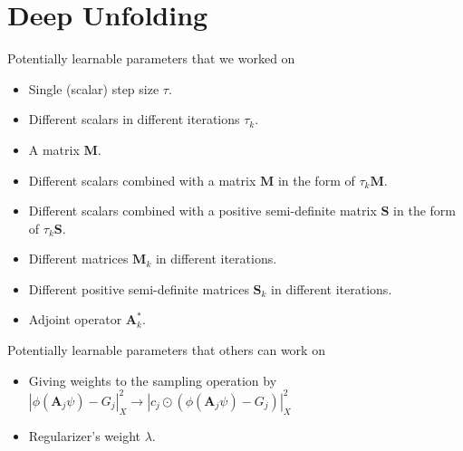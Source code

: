 \chapter{Deep Unfolding}

Potentially learnable parameters that we worked on\\
\begin{itemize}
  \item Single (scalar) step size $\tau$.
  \item Different scalars in different iterations $\tau_k$.
  \item A matrix $\boldsymbol{M}$.
  \item Different scalars combined with a matrix $\boldsymbol{M}$ in the form of $\tau_k \boldsymbol{M}$.
  \item Different scalars combined with a positive semi-definite matrix $\boldsymbol{S}$ in the form of $\tau_k \boldsymbol{S}$.
  \item Different matrices $\boldsymbol{M}_k$ in different iterations.
  \item Different positive semi-definite matrices $\boldsymbol{S}_k$ in different iterations.
  \item Adjoint operator $\boldsymbol{A}_k^*$.  
\end{itemize}

Potentially learnable parameters that others can work on\\
\begin{itemize}
  \item Giving weights to the sampling operation by $\left|\phi(\boldsymbol{A}_j\psi)-G_j\right|_X^2 \rightarrow \left|c_j \odot \left(\phi(\boldsymbol{A}_j\psi)-G_j\right)\right|_X^2$
  \item Regularizer's weight $\lambda$.
\end{itemize}
